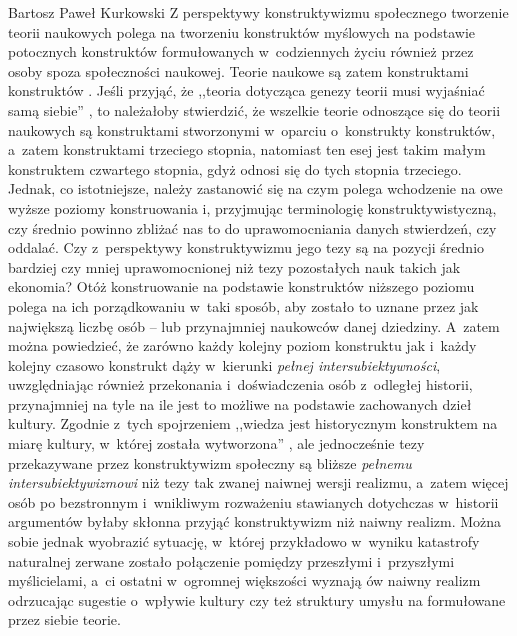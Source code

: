 \begin{artplenv}{Bartosz Paweł Kurkowski}
Z perspektywy konstruktywizmu społecznego tworzenie teorii naukowych polega na tworzeniu konstruktów myślowych na
podstawie potocznych konstruktów formułowanych w~codziennych życiu również przez osoby spoza społeczności naukowej.
Teorie naukowe są zatem konstruktami konstruktów
\parencites{schutz_potoczna_1984}[zob.][s.~34]{zboron_teorie_2009}.
Jeśli przyjąć, że ,,teoria dotycząca genezy teorii musi wyjaśniać samą siebie''
\parencite[s.~17]{leszczynski_poszukiwanie_2016},
to należałoby stwierdzić, że wszelkie teorie odnoszące się do teorii naukowych są konstruktami
stworzonymi w~oparciu o~konstrukty konstruktów, a~zatem konstruktami trzeciego stopnia, natomiast ten esej jest takim
małym konstruktem czwartego stopnia, gdyż odnosi się do tych stopnia trzeciego. Jednak, co istotniejsze, należy
zastanowić się na czym polega wchodzenie na owe wyższe poziomy konstruowania i, przyjmując terminologię
konstruktywistyczną, czy średnio powinno zbliżać nas to do uprawomocniania danych stwierdzeń, czy oddalać.
Czy z~perspektywy konstruktywizmu jego tezy są na pozycji średnio bardziej czy mniej uprawomocnionej niż tezy pozostałych
nauk takich jak ekonomia? Otóż konstruowanie na podstawie konstruktów niższego poziomu polega na ich
porządkowaniu w~taki sposób, aby zostało to uznane przez jak największą liczbę osób -- lub przynajmniej naukowców danej
dziedziny. A~zatem można powiedzieć, że zarówno każdy kolejny poziom konstruktu jak i~każdy kolejny czasowo konstrukt
dąży w~kierunki \textit{pełnej intersubiektywności}, uwzględniając również przekonania i~doświadczenia osób z~odległej
historii, przynajmniej na tyle na ile jest to możliwe na podstawie zachowanych dzieł kultury. Zgodnie z~tych
spojrzeniem ,,wiedza jest historycznym konstruktem na miarę kultury, w~której została wytworzona''
\parencite[s.~29]{zboron_teorie_2009},
ale jednocześnie tezy przekazywane przez konstruktywizm społeczny są
bliższe \textit{pełnemu intersubiektywizmowi} niż tezy tak zwanej naiwnej wersji realizmu, a~zatem więcej osób po
bezstronnym i~wnikliwym rozważeniu stawianych dotychczas w~historii argumentów byłaby skłonna przyjąć konstruktywizm
niż naiwny realizm. Można sobie jednak wyobrazić sytuację, w~której przykładowo w~wyniku katastrofy naturalnej zerwane
zostało połączenie pomiędzy przeszłymi i~przyszłymi myślicielami, a~ci ostatni w~ogromnej większości wyznają ów naiwny
realizm odrzucając sugestie o~wpływie kultury czy też struktury umysłu na formułowane przez siebie teorie.

\end{artplenv}
